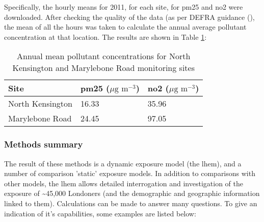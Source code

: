 Specifically, the hourly means for 2011, for each site, for \gls{pm25} and \gls{no2} were downloaded. After checking the quality of the data (as per DEFRA guidance (\cite{DEFRA2009}), the mean of all the hours was taken to calculate the annual average pollutant concentration at that location. The results are shown in Table \ref{tab:mean_monitoring_site_concentrations}:

\begin{table}[H]
\caption{Annual mean pollutant concentrations for North Kensington and Marylebone Road monitoring sites}
\centering
    \begin{tabular}{ | l | l | l |}
    \hline 
     \bfseries{Site} & \bfseries{\gls{pm25} ($\mu \text{g m}^{-3}$)} & \bfseries{\gls{no2} ($\mu \text{g m}^{-3}$)}  \\ \hline
     North Kensington & 16.33 & 35.96\\ \hline
     Marylebone Road & 24.45 & 97.05\\ \hline
    \end{tabular}
\label{tab:mean_monitoring_site_concentrations}
\end{table}

\subsubsection{Methods summary}
\label{subsubsec:methods_summary}

The result of these methods is a dynamic exposure model (the \gls{lhem}), and a number of comparison 'static' exposure models. In addition to comparisons with other models, the \gls{lhem} allows detailed interrogation and investigation of the exposure of \textasciitilde45,000 Londoners (and the demographic and geographic information linked to them). Calculations can be made to answer many questions. To give an indication of it's capabilities, some examples are listed below:

